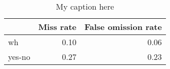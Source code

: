 \begin{table}[!ht]
\centering
\begin{tabular}{lrr}
\toprule
{} &  Miss rate &  False omission rate \\
\midrule
wh     &       0.10 &                 0.06 \\
yes-no &       0.27 &                 0.23 \\
\bottomrule
\end{tabular}
\caption{My caption here}
\label{tab:INTERROGATIVE-ocd-combined-errors}
\end{table}